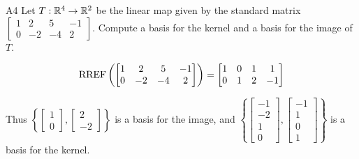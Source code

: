 \begin{problem}{A4}
Let $T: \mathbb{R}^4 \rightarrow \mathbb{R}^2$ be the linear map given by the standard matrix
\(
  \begin{bmatrix}
    1 & 2 & 5 & -1 \\
    0 & -2 & -4 & 2
  \end{bmatrix}
\). Compute a basis for the kernel and a basis for the image of $T$.
\end{problem}
\begin{solution}
\[
  \operatorname{RREF} \left( \begin{bmatrix}
    1 & 2 & 5 & -1 \\
    0 & -2 & -4 & 2
  \end{bmatrix} \right) = \begin{bmatrix}
    1 & 0 & 1 & 1 \\
    0 & 1 & 2 & -1
  \end{bmatrix}
\]

Thus \(\left\{
  \begin{bmatrix} 1 \\ 0  \end{bmatrix},
  \begin{bmatrix} 2 \\ -2 \end{bmatrix}
\right\} \) is a basis for the image, and \(\left\{
  \begin{bmatrix} -1 \\ -2 \\ 1 \\ 0 \end{bmatrix},
  \begin{bmatrix} -1 \\ 1 \\ 0 \\ 1 \end{bmatrix}
\right\} \) is a basis for the kernel.
\end{solution}


